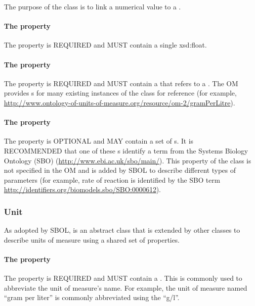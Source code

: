 The purpose of the  class is to link a numerical value to a . 

\paragraph{The  property}\label{sec:hasNumericalValue}
The  property is REQUIRED and MUST contain a single xsd:float.

\paragraph{The  property}\label{sec:hasUnit:Measure}
The  property is REQUIRED and MUST contain a  that refers to a . The OM provides s for many existing instances of the  class for reference (for example, \url{http://www.ontology-of-units-of-measure.org/resource/om-2/gramPerLitre}).

\paragraph{The  property}\label{sec:types:Measure}
The  property is OPTIONAL and MAY contain a set of s. It is RECOMMENDED that one of these s identify a term from the Systems Biology Ontology (SBO) (\url{http://www.ebi.ac.uk/sbo/main/}). This  property of the  class is not specified in the OM and is added by SBOL to describe different types of parameters (for example, rate of reaction is identified by the SBO term \url{http://identifiers.org/biomodels.sbo/SBO:0000612}).

\subsubsection{Unit}
\label{sec:Unit}

As adopted by SBOL,  is an abstract class that is extended by other classes to describe units of measure using a shared set of properties. 

\paragraph{The  property}\label{sec:symbol:Unit}
The  property is REQUIRED and MUST contain a . This  is commonly used to abbreviate the unit of measure's name. For example, the unit of measure named ``gram per liter'' is commonly abbreviated using the  ``g/l''.

